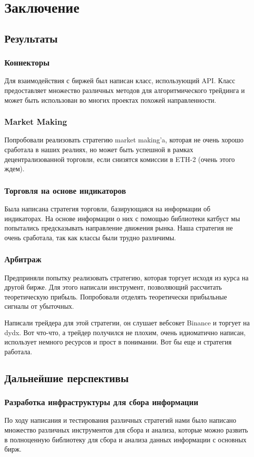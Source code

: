 \section{Заключение}
\subsection{Результаты}
\subsubsection{Коннекторы}
Для взаимодействия с биржей был написан класс, использующий API. Класс предоставляет множество различных методов для алгоритмического трейдинга и может быть использован во многих проектах похожей направленности.
\subsubsection{Market Making}
Попробовали реализовать стратегию market making'a, которая не очень хорошо сработала в наших реалиях, но может быть успешной в рамках децентрализованной торговли, если снизятся комиссии в ETH-2 (очень этого ждем).
\subsubsection{Торговля на основе индикаторов}
Была написана стратегия торговли, базирующаяся на информации об индикаторах. На основе информации о них с помощью библиотеки катбуст мы попытались предсказывать направление движения рынка. Наша стратегия не очень сработала, так как классы были трудно различимы.
\subsubsection{Арбитраж}
Предприняли попытку реализовать стратегию, которая торгует исходя из курса на другой бирже. Для этого написали инструмент, позволяющий рассчитать теоретическую прибыль. Попробовали отделять теоретически прибыльные сигналы от убыточных. 

Написали трейдера для этой стратегии, он слушает вебсокет Binance и торгует на dydx. Вот что-что, а трейдер получился не плохим, очень идиоматично написан, использует немного ресурсов и прост в понимании. Вот бы еще и стратегия работала.

\subsection{Дальнейшие перспективы}
\subsubsection{Разработка инфраструктуры для сбора информации}
По ходу написания и тестирования различных стратегий нами было написано множество различных инструментов для сбора и анализа, которые можно развить в полноценную библиотеку для сбора и анализа данных информации с основных бирж.
